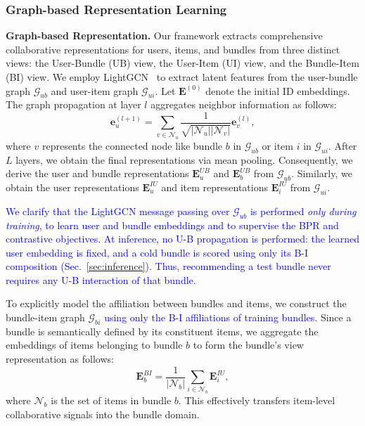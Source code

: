 \documentclass[lettersize,journal]{IEEEtran}
\newcommand{\revise}[1]{\textcolor{blue}{#1}}
\begin{document}
\subsubsection{Graph-based Representation Learning}
\noindent \textbf{Graph-based Representation.}
Our framework extracts comprehensive collaborative representations for users, items, and bundles from three distinct views: the User-Bundle (UB) view, the User-Item (UI) view, and the Bundle-Item (BI) view. We employ LightGCN~\cite{he2020lightgcn} to extract latent features from the user-bundle graph $\mathcal{G}_{ub}$ and user-item graph $\mathcal{G}_{ui}$. Let $\mathbf{E}^{(0)}$ denote the initial ID embeddings. The graph propagation at layer $l$ aggregates neighbor information as follows:
\begin{equation}
    \mathbf{e}_{u}^{(l+1)} = \sum_{v \in \mathcal{N}_u} \frac{1}{\sqrt{|\mathcal{N}_u||\mathcal{N}_v|}} \mathbf{e}_{v}^{(l)},
\end{equation}
where $v$ represents the connected node like bundle $b$ in $\mathcal{G}_{ub}$ or item $i$ in $\mathcal{G}_{ui}$. After $L$  layers, we obtain the final representations via mean pooling. Consequently, we derive the user and bundle representations $\mathbf{E}_u^{UB}$ and $\mathbf{E}_b^{UB}$ from $\mathcal{G}_{ub}$. Similarly, we obtain the user representations $\mathbf{E}_u^{IU}$ and item representations $\mathbf{E}_i^{IU}$ from $\mathcal{G}_{ui}$.

\revise{We clarify that the LightGCN message passing over $\mathcal{G}_{ub}$ is performed \emph{only during training}, to learn user and bundle embeddings and to supervise the BPR and contrastive objectives. At inference, no U-B propagation is performed: the learned user embedding is fixed, and a cold bundle is scored using only its B-I composition (Sec.~\ref{sec:inference}). Thus, recommending a test bundle never requires any U-B interaction of that bundle.}

To explicitly model the affiliation between bundles and items, we construct the bundle-item graph $\mathcal{G}_{bi}$ \revise{using only the B-I affiliations of training bundles}. Since a bundle is semantically defined by its constituent items, we aggregate the embeddings of items belonging to bundle $b$ to form the bundle's view representation as follows:
\begin{equation}
    \mathbf{E}_b^{BI} = \frac{1}{|\mathcal{N}_b|} \sum_{i \in \mathcal{N}_b} \mathbf{E}_i^{IU},
\end{equation}
where $\mathcal{N}_b$ is the set of items in bundle $b$. This effectively transfers item-level collaborative signals into the bundle domain.
\end{document}
